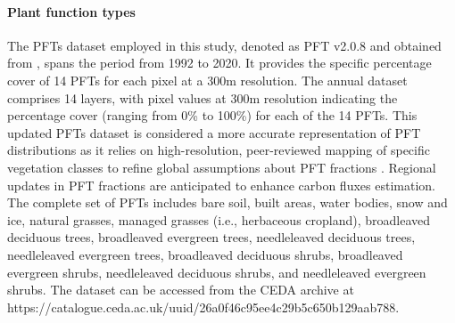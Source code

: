 \paragraph*{Plant function types}
The PFTs dataset employed in this study, denoted as PFT v2.0.8 and obtained from \citep{harper202229}, spans the period from 1992 to 2020. It provides the specific percentage cover of 14 PFTs for each pixel at a 300m resolution. The annual dataset comprises 14 layers, with pixel values at 300m resolution indicating the percentage cover (ranging from 0\% to 100\%) for each of the 14 PFTs. This updated PFTs dataset is considered a more accurate representation of PFT distributions as it relies on high-resolution, peer-reviewed mapping of specific vegetation classes to refine global assumptions about PFT fractions \citep{harper202229}. Regional updates in PFT fractions are anticipated to enhance carbon fluxes estimation. The complete set of PFTs includes bare soil, built areas, water bodies, snow and ice, natural grasses, managed grasses (i.e., herbaceous cropland), broadleaved deciduous trees, broadleaved evergreen trees, needleleaved deciduous trees, needleleaved evergreen trees, broadleaved deciduous shrubs, broadleaved evergreen shrubs, needleleaved deciduous shrubs, and needleleaved evergreen shrubs. The dataset can be accessed from the CEDA archive at https://catalogue.ceda.ac.uk/uuid/26a0f46c95ee4c29b5c650b129aab788.\par

